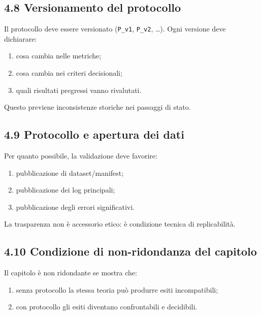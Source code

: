 \subsection{4.8 Versionamento del protocollo}

Il protocollo deve essere versionato (\texttt{P\_v1}, \texttt{P\_v2}, \ldots). Ogni versione deve dichiarare:

\begin{enumerate}
\def\labelenumi{\arabic{enumi}.}
\tightlist
\item
  cosa cambia nelle metriche;
\item
  cosa cambia nei criteri decisionali;
\item
  quali risultati pregressi vanno rivalutati.
\end{enumerate}

Questo previene inconsistenze storiche nei passaggi di stato.

\subsection{4.9 Protocollo e apertura dei dati}

Per quanto possibile, la validazione deve favorire:

\begin{enumerate}
\def\labelenumi{\arabic{enumi}.}
\tightlist
\item
  pubblicazione di dataset/manifest;
\item
  pubblicazione dei log principali;
\item
  pubblicazione degli errori significativi.
\end{enumerate}

La trasparenza non è accessorio etico: è condizione tecnica di replicabilità.

\subsection{4.10 Condizione di non-ridondanza del capitolo}

Il capitolo è non ridondante se mostra che:

\begin{enumerate}
\def\labelenumi{\arabic{enumi}.}
\tightlist
\item
  senza protocollo la stessa teoria può produrre esiti incompatibili;
\item
  con protocollo gli esiti diventano confrontabili e decidibili.
\end{enumerate}

